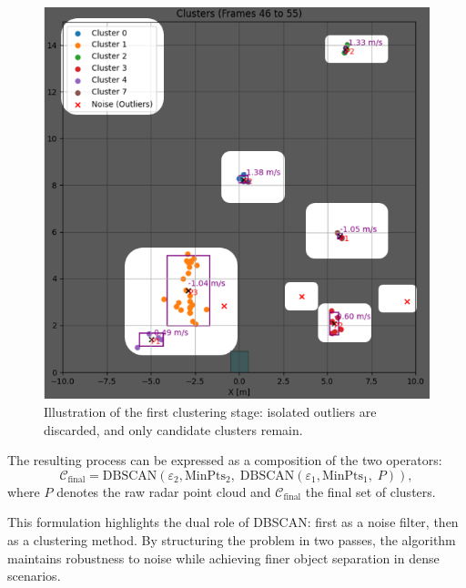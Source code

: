 \begin{figure}[!htbp]
    \centering
    \includegraphics[width=1.0\linewidth]{images/clustering.png}
    \caption{Illustration of the first clustering stage: isolated outliers are discarded, and only candidate clusters remain.}
    \label{fig:first_clustering_stage}
\end{figure}

The resulting process can be expressed as a composition of the two operators:
\begin{equation}
    \mathcal{C}_{\text{final}} = \text{DBSCAN}(\varepsilon_2, \text{MinPts}_2, \; \text{DBSCAN}(\varepsilon_1, \text{MinPts}_1, \; P)),
\end{equation}
where $P$ denotes the raw radar point cloud and $\mathcal{C}_{\text{final}}$ the final set of clusters.  

This formulation highlights the dual role of DBSCAN: first as a noise filter, then as a clustering method.  
By structuring the problem in two passes, the algorithm maintains robustness to noise while achieving finer object separation in dense scenarios.
